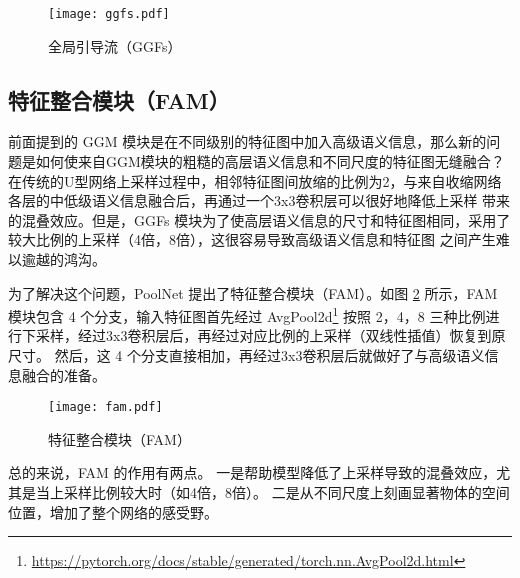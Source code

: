 \begin{figure}[h]
\centering
\texttt{[image: ggfs.pdf]}
\caption{全局引导流（GGFs）}
\label{fig:ggf}
\end{figure}

\subsection{特征整合模块（FAM）}

前面提到的 GGM 模块是在不同级别的特征图中加入高级语义信息，那么新的问题是如何使来自GGM模块的粗糙的高层语义信息和不同尺度的特征图无缝融合？
在传统的U型网络上采样过程中，相邻特征图间放缩的比例为2，与来自收缩网络各层的中低级语义信息融合后，再通过一个3x3卷积层可以很好地降低上采样
带来的混叠效应。但是，GGFs 模块为了使高层语义信息的尺寸和特征图相同，采用了较大比例的上采样（4倍，8倍），这很容易导致高级语义信息和特征图
之间产生难以逾越的鸿沟。

为了解决这个问题，PoolNet 提出了特征整合模块（FAM）。如图 \ref{fig:fam} 所示，FAM 模块包含 4 个分支，输入特征图首先经过
AvgPool2d\footnote{\url{https://pytorch.org/docs/stable/generated/torch.nn.AvgPool2d.html}}
按照 2，4，8 三种比例进行下采样，经过3x3卷积层后，再经过对应比例的上采样（双线性插值）恢复到原尺寸。
然后，这 4 个分支直接相加，再经过3x3卷积层后就做好了与高级语义信息融合的准备。

\begin{figure}[h]
\centering
\texttt{[image: fam.pdf]}
\caption{特征整合模块（FAM）}
\label{fig:fam}
\end{figure}

总的来说，FAM 的作用有两点。
一是帮助模型降低了上采样导致的混叠效应，尤其是当上采样比例较大时（如4倍，8倍）。
二是从不同尺度上刻画显著物体的空间位置，增加了整个网络的感受野。
